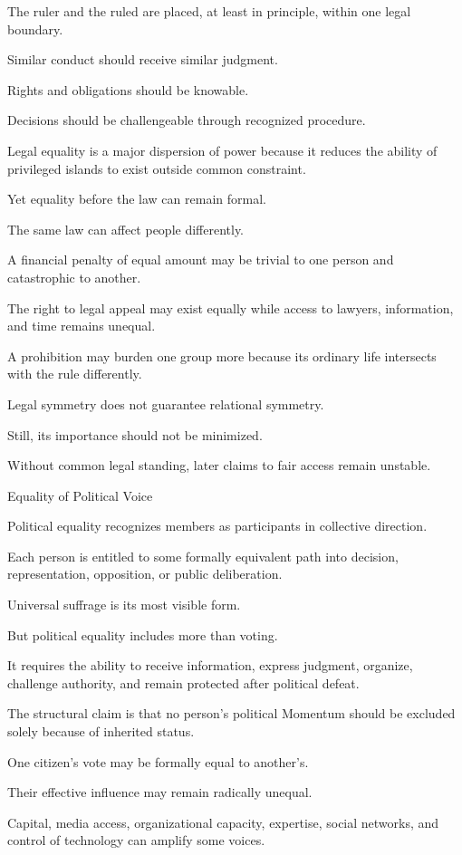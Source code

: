 The ruler and the ruled are placed, at least in principle, within one legal boundary.

Similar conduct should receive similar judgment.

Rights and obligations should be knowable.

Decisions should be challengeable through recognized procedure.

Legal equality is a major dispersion of power because it reduces the ability of privileged islands to exist outside common constraint.

Yet equality before the law can remain formal.

The same law can affect people differently.

A financial penalty of equal amount may be trivial to one person and catastrophic to another.

The right to legal appeal may exist equally while access to lawyers, information, and time remains unequal.

A prohibition may burden one group more because its ordinary life intersects with the rule differently.

Legal symmetry does not guarantee relational symmetry.

Still, its importance should not be minimized.

Without common legal standing, later claims to fair access remain unstable.

Equality of Political Voice

Political equality recognizes members as participants in collective direction.

Each person is entitled to some formally equivalent path into decision, representation, opposition, or public deliberation.

Universal suffrage is its most visible form.

But political equality includes more than voting.

It requires the ability to receive information, express judgment, organize, challenge authority, and remain protected after political defeat.

The structural claim is that no person’s political Momentum should be excluded solely because of inherited status.

One citizen’s vote may be formally equal to another’s.

Their effective influence may remain radically unequal.

Capital, media access, organizational capacity, expertise, social networks, and control of technology can amplify some voices.

